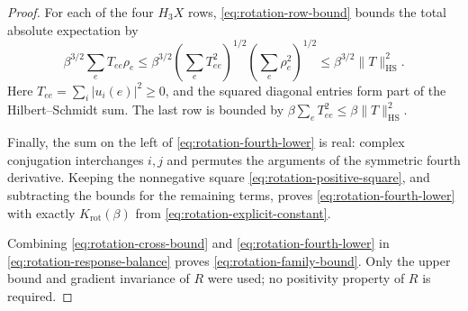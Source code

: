 \begin{proof}
For each of the four \(H_3X\) rows,
\eqref{eq:rotation-row-bound} bounds the total absolute expectation by
\[
\beta^{3/2}\sum_e T_{ee}\rho_e
\le\beta^{3/2}
\left(\sum_e T_{ee}^2\right)^{1/2}
\left(\sum_e\rho_e^2\right)^{1/2}
\le\beta^{3/2}\|T\|_{\mathrm{HS}}^2.
\]
Here \(T_{ee}=\sum_i|u_i(e)|^2\ge0\), and the squared diagonal
entries form part of the Hilbert--Schmidt sum. The last row is bounded
by \(\beta\sum_e T_{ee}^2\le\beta\|T\|_{\mathrm{HS}}^2\).

Finally, the sum on the left of \eqref{eq:rotation-fourth-lower} is
real: complex conjugation interchanges \(i,j\) and permutes the
arguments of the symmetric fourth derivative. Keeping the nonnegative
square \eqref{eq:rotation-positive-square}, and subtracting the bounds
for the remaining terms, proves \eqref{eq:rotation-fourth-lower} with
exactly \(K_{\mathrm{rot}}(\beta)\) from
\eqref{eq:rotation-explicit-constant}.

Combining \eqref{eq:rotation-cross-bound} and
\eqref{eq:rotation-fourth-lower} in
\eqref{eq:rotation-response-balance} proves
\eqref{eq:rotation-family-bound}. Only the upper bound and gradient
invariance of \(R\) were used; no positivity property of \(R\) is
required.
\end{proof}
